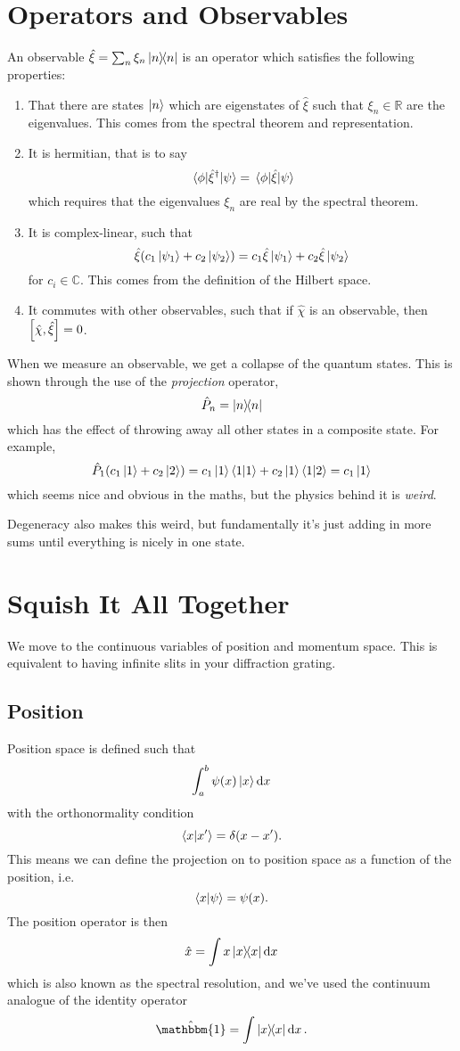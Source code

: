 \documentclass[]{revision-notes}
\begin{document}
\section{Operators and Observables}
An observable \(\hat\xi = \sum_n \xi_n \op{n}\) is an operator which satisfies the following properties:
\begin{enumerate}
  \item That there are states \(\ket{n}\) which are eigenstates of $\hat \xi$ such that $\xi_n \in \mathbb{R}$ are the eigenvalues.
  This comes from the spectral theorem and representation.
  \item It is hermitian, that is to say \[\mel{\phi}{\hat\xi^\dagger}{\psi} =\mel{\phi}{\hat\xi}{\psi}\] which requires that the eigenvalues $\xi_n$ are real by the spectral theorem.
  \item It is complex-linear, such that \[ \hat\xi(c_1 \ket{\psi_1} + c_2 \ket{\psi_2} ) = c_1\hat\xi \ket{\psi_1} + c_2\hat\xi \ket{\psi_2} \] for $c_i \in \mathbb{C}$. This comes from the definition of the Hilbert space.
  \item It commutes with other observables, such that if $\hat{\chi}$ is an observable, then $\commutator{\hat\chi}{\hat\xi}=0$.
\end{enumerate}

When we measure an observable, we get a collapse of the quantum states.
This is shown through the use of the \emph{projection} operator, \[\hat{P}_n = \ketbra{n}\] which has the effect of throwing away all other states in a composite state.
For example, \[ \hat{P}_1 (c_1\ket{1} + c_2\ket{2}) = c_1\ket{1}\braket{1} + c_2\ket{1}\bra{1}\ket{2} = c_1 \ket{1} \] which seems nice and obvious in the maths, but the physics behind it is \emph{weird}.

Degeneracy also makes this weird, but fundamentally it's just adding in more sums until everything is nicely in one state.

\section{Squish It All Together}
We move to the continuous variables of position and momentum space.
This is equivalent to having infinite slits in your diffraction grating.

\subsection{Position}
Position space is defined such that \[ \int_a^b \psi(x) \ket{x} \dd{x}\] with the orthonormality condition \[\braket{x}{x^\prime}=\delta(x-x^\prime). \]
This means we can define the projection on to position space as a function of the position, i.e.~\[\braket{x}{\psi} = \psi(x).\]
The position operator is then \[ \hat{x} = \int x \ketbra{x} \dd{x} \] which is also known as the spectral resolution, and we've used the continuum analogue of the identity operator
\[ \hat{\mathbbm{1}} = \int \ketbra{x}\dd{x}. \]
\end{document}
